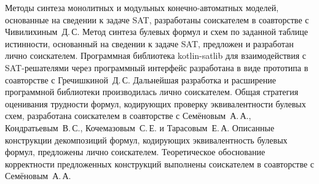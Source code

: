 %
\contribution
%
Методы синтеза монолитных и модульных конечно-автоматных моделей, основанные на сведении к задаче SAT, разработаны соискателем в соавторстве с Чивилихиным~Д.\,С.
Метод синтеза булевых формул и схем по заданной таблице истинности, основанный на сведении к задаче SAT, предложен и разработан лично соискателем.
Программная библиотека kotlin-satlib для взаимодействия с SAT-решателями через программный интерфейс разработана в виде прототипа в соавторстве с Гречишкиной~Д.\,С.
Дальнейшая разработка и расширение программной библиотеки производилась лично соискателем.
Общая стратегия оценивания трудности формул, кодирующих проверку эквивалентности булевых схем, разработана соискателем в соавторстве с Семёновым~А.\,А., Кондратьевым~В.\,С., Кочемазовым~С.\,Е. и Тарасовым~Е.\,А.
Описанные конструкции декомпозиций формул, кодирующих эквивалентность булевых формул, предложены лично соискателем.
Теоретическое обоснование корректности предложенных конструкций выполнены соискателем в соавторстве с Семёновым~А.\,А.
